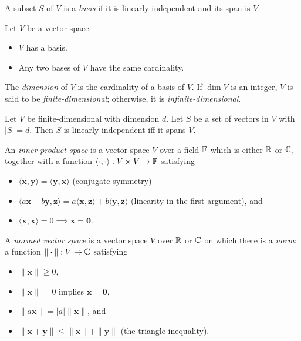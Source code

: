 \begin{defn}
  A subset $S$ of $V$ is a \emph{basis} if it is linearly independent and its
  span is $V$.
\end{defn}
\begin{thm}
  Let $V$ be a vector space.
  \begin{itemize}
    \item $V$ has a basis.
    \item Any two bases of $V$ have the same cardinality.
  \end{itemize}
\end{thm}
\begin{defn}
  The \emph{dimension} of $V$ is the cardinality of a basis of $V$. If $\dim V$
  is an integer, $V$ is said to be \emph{finite-dimensional}; otherwise, it is
  \emph{infinite-dimensional}.
\end{defn}
\begin{prop}
  Let $V$ be finite-dimensional with dimension $d$.
  Let $S$ be a set of vectors in $V$ with $|S|=d$. Then $S$ is linearly
  independent iff it spans $V$.
\end{prop}
\begin{defn}
  An \emph{inner product space} is a vector space $V$ over a field $\mathbb{F}$ which
  is either $\mathbb{R}$ or $\mathbb{C}$, together with a function
  $\langle\cdot,\cdot\rangle:V\times V\to\mathbb{F}$ satisfying
  \begin{itemize}
    \item $\langle \mathbf x,\mathbf y\rangle=\overline{\langle \mathbf
      y,\mathbf x\rangle}$ (conjugate
      symmetry)
    \item $\langle a\mathbf x+b\mathbf y,\mathbf z\rangle=a\langle\mathbf
      x,\mathbf z\rangle+b\langle\mathbf y,\mathbf z\rangle$ (linearity in the
      first argument), and
    \item $\langle\mathbf x,\mathbf x\rangle=0\implies\mathbf x=\mathbf 0$.
  \end{itemize}
\end{defn}
\begin{defn}
  A \emph{normed vector space} is a vector space $V$ over $\mathbb{R}$ or $\mathbb{C}$
  on which there is a \emph{norm}: a function $\|\cdot\|:V\to\mathbb{C}$ satisfying
  \begin{itemize}
    \item $\|\mathbf x\|\ge 0$,
    \item $\|\mathbf x\|=0$ implies $\mathbf x=\mathbf 0$,
    \item $\|a\mathbf x\|=|a|\|\mathbf x\|$, and
    \item $\|\mathbf x+\mathbf y\|\le\|\mathbf x\|+\|\mathbf y\|$ (the triangle
      inequality).
  \end{itemize}
\end{defn}
